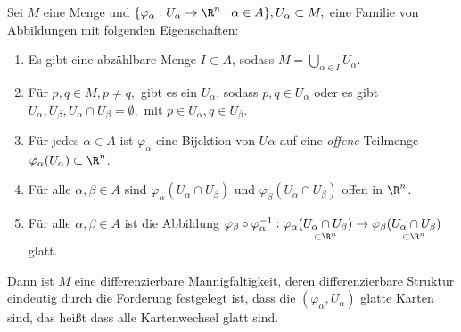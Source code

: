 \begin{lem}\label{1.14}
	Sei $M$ eine Menge und $ \{\varphi_\alpha: U_\alpha \to \R^n \mid \alpha \in A\}, U_\alpha \subset M, $ eine Familie von Abbildungen mit folgenden Eigenschaften:
	\begin{enumerate}[label={\roman*})]
		\item Es gibt eine abzählbare Menge $ I \subset A $, sodass $ M = \bigcup\limits_{\alpha \in I}U_\alpha. $
		\item Für $ p,q \in M, p \neq q, $ gibt es ein $ U_\alpha $, sodass $ p,q \in U_\alpha $ oder es gibt $ U_\alpha,U_\beta, U_\alpha \cap U_\beta = \emptyset, $ mit $ p \in U_\alpha, q \in U_\beta. $
		\item Für jedes $ \alpha \in A $ ist $ \varphi_\alpha $ eine Bijektion von $ U\alpha $ auf eine \emph{offene} Teilmenge $ \varphi_\alpha(U_\alpha) \subset \R^n $.
		\item Für alle $ \alpha,\beta \in A $ sind $ \varphi_\alpha(U_\alpha \cap U_\beta) $ und $ \varphi_\beta(U_\alpha \cap U_\beta) $ offen in $\R^n$.
		\item Für alle $ \alpha,\beta \in A $ ist die Abbildung $ \varphi_\beta \circ \varphi_\alpha^{-1}: \varphi_\alpha( \underset{\subset \R^n}{U_\alpha \cap U_\beta} ) \to \varphi_\beta( \underset{\subset \R^n}{U_\alpha \cap U_\beta} ) $ glatt.
	\end{enumerate}
	Dann ist $M$ eine differenzierbare Mannigfaltigkeit, deren differenzierbare Struktur eindeutig durch die Forderung festgelegt ist, dass die $ (\varphi_\alpha,U_\alpha) $ glatte Karten sind, das heißt dass alle Kartenwechsel glatt sind.
\end{lem}